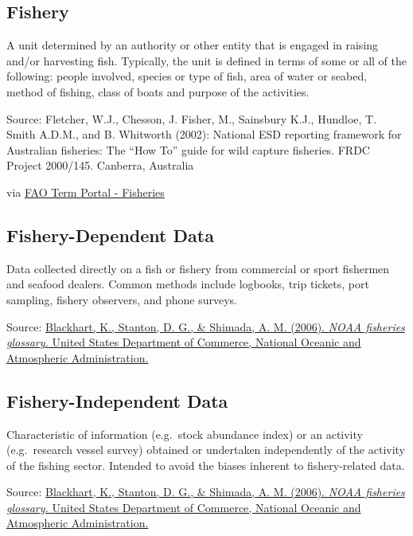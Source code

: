 \documentclass[
  11pt,
]{book}
\begin{document}
\hypertarget{fishery}{%
\subsection{Fishery}\label{fishery}}

A unit determined by an authority or other entity that is engaged in raising and/or harvesting fish. Typically, the unit is defined in terms of some or all of the following: people involved, species or type of fish, area of water or seabed, method of fishing, class of boats and purpose of the activities.

Source: Fletcher, W.J., Chesson, J. Fisher, M., Sainsbury K.J., Hundloe, T. Smith A.D.M., and B. Whitworth (2002): National ESD reporting framework for Australian fisheries: The ``How To'' guide for wild capture fisheries. FRDC Project 2000/145. Canberra, Australia

via \href{http://www.fao.org/fishery/glossary/en}{FAO Term Portal - Fisheries}

\hypertarget{fishery-dependent-data}{%
\subsection{Fishery-Dependent Data}\label{fishery-dependent-data}}

Data collected directly on a fish or fishery from commercial or sport fishermen and seafood dealers. Common methods include logbooks, trip tickets, port sampling, fishery observers, and phone surveys.

Source: \href{https://repository.library.noaa.gov/view/noaa/12856}{Blackhart, K., Stanton, D. G., \& Shimada, A. M. (2006). \emph{NOAA fisheries glossary.} United States Department of Commerce, National Oceanic and Atmospheric Administration.}

\hypertarget{fishery-independent-data}{%
\subsection{Fishery-Independent Data}\label{fishery-independent-data}}

Characteristic of information (e.g.~stock abundance index) or an activity (e.g.~research vessel survey) obtained or undertaken independently of the activity of the ﬁshing sector. Intended to avoid the biases inherent to ﬁshery-related data.

Source: \href{https://repository.library.noaa.gov/view/noaa/12856}{Blackhart, K., Stanton, D. G., \& Shimada, A. M. (2006). \emph{NOAA fisheries glossary.} United States Department of Commerce, National Oceanic and Atmospheric Administration.}
\end{document}
